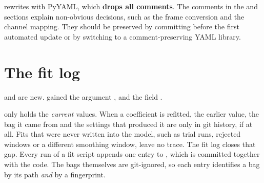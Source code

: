 \begin{caution}
 rewrites  with PyYAML, which \textbf{drops all comments}.
The comments in the  and  sections explain non-obvious
decisions, such as the frame conversion and the channel mapping. They should be preserved by
committing before the first automated update or by switching to a comment-preserving YAML library.
\end{caution}

\section{The fit log}
\label{sec:fit-log}

\begin{revised}[title={New section, added 16 October 2026}]
 and  are new.  gained
the argument , and  the field .
\end{revised}

 only holds the \emph{current} values. When a coefficient is refitted, the
earlier value, the bag it came from and the settings that produced it are only in git
history, if at all. Fits that were never written into the model, such as trial runs,
rejected windows or a different smoothing window, leave no trace. The fit log closes that gap.
Every run of a fit script appends one entry to , which
is committed together with the code. The bags themselves are git-ignored, so each entry
identifies a bag by its path \emph{and} by a fingerprint.

